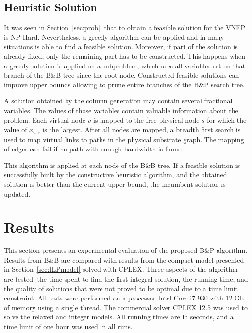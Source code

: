 \documentclass[conference]{IEEEtran}
\begin{document}
\subsection{Heuristic Solution}
\label{sec:heur}
It was seen in Section~\ref{sec:prob}, that to obtain a feasible solution for the VNEP is NP-Hard.
Nevertheless, a greedy algorithm can be applied and in many situations is able to find a feasible solution.
Moreover, if part of the solution is already fixed, only the remaining part has to be constructed.
This happens when a greedy solution is applied on a subproblem, which uses all variables set on that branch of the B\&B tree since the root node.
Constructed feasible solutions can improve upper bounds allowing to prune entire branches of the B\&P search tree.

A solution obtained by the column generation may contain several fractional variables. 
The values of those variables contain valuable information about the problem. 
Each virtual node $v$ is mapped to the free physical node $s$ for which the value of $x_{v,s}$ is the largest. 
After all nodes are mapped, a breadth first search is used to map virtual links to paths in the physical substrate graph. The mapping of edges can fail if no path with enough bandwidth is found.

This algorithm is applied at each node of the B\&B tree. If a feasible solution is successfully built by the constructive heuristic algorithm, and the obtained solution is better than the current upper bound, the incumbent solution is updated.


\section{Results}
\label{sec:results}
This section presents an experimental evaluation of the proposed B\&P algorithm. 
Results from B\&B are compared with results from the compact model presented in Section~\ref{sec:ILPmodel} solved with CPLEX\@. 
Three aspects of the algorithm are tested: the time spent to find the first integral solution, the running time, and the quality of solutions that were not proved to be optimal due to a time limit constraint. 
All tests were performed on a processor Intel Core i7 930 with 12 Gb of memory using a single thread. The commercial solver CPLEX 12.5 was used to solve the relaxed and integer models. All running times are in seconds, and a time limit of one hour was used in all runs.
\end{document}
